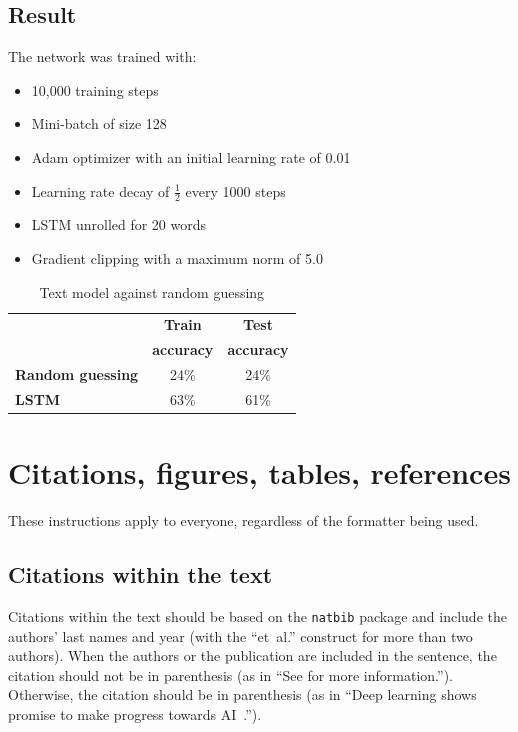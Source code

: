 \documentclass{article} %
\begin{document}
\subsection{Result}
The network was trained with:
\begin{itemize}[topsep=0pt]
    \item 10,000 training steps
    \item Mini-batch of size 128
    \item Adam optimizer with an initial learning rate of 0.01
    \item Learning rate decay of $\frac{1}{2}$ every 1000 steps
    \item LSTM unrolled for 20 words
    \item Gradient clipping with a maximum norm of 5.0
\end{itemize}

\begin{table}[H]
\caption{Text model against random guessing}
\begin{center}
    \begin{tabular}{| l | c | c |}
    \hline
    & \textbf{Train} & \textbf{Test} \\
    & \textbf{accuracy} & \textbf{accuracy} \\ \hline
    \textbf{Random guessing} & 24\% & 24\% \\ \hline
    \textbf{LSTM}  & 63\% & 61\% \\
    \hline
    \end{tabular}
\end{center} 
\end{table}


\section{Citations, figures, tables, references}
\label{others}

These instructions apply to everyone, regardless of the formatter being used.

\subsection{Citations within the text}

Citations within the text should be based on the \texttt{natbib} package
and include the authors' last names and year (with the ``et~al.'' construct
for more than two authors). When the authors or the publication are
included in the sentence, the citation should not be in parenthesis (as
in ``See \citet{Hinton06} for more information.''). Otherwise, the citation
should be in parenthesis (as in ``Deep learning shows promise to make progress towards AI~\citep{Bengio+chapter2007}.'').
\end{document}
